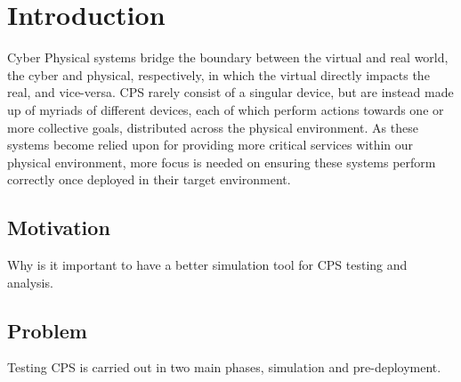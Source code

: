 \chapter{Introduction}



Cyber Physical systems bridge the boundary between the virtual and real world, the cyber and physical, respectively, in which the virtual directly impacts the real, and vice-versa.
CPS rarely consist of a singular device, but are instead made up of myriads of different devices, each of which perform actions towards one or more collective goals, distributed across the physical environment.
As these systems become relied upon for providing more critical services within our physical environment, more focus is needed on ensuring these systems perform correctly once deployed in their target environment.


\section{Motivation}%
\label{sec:Motivation}
Why is it important to have a better simulation tool for CPS testing and analysis.

\section{Problem}
\label{sec:Problem}


Testing CPS is carried out in two main phases, simulation and pre-deployment. 

